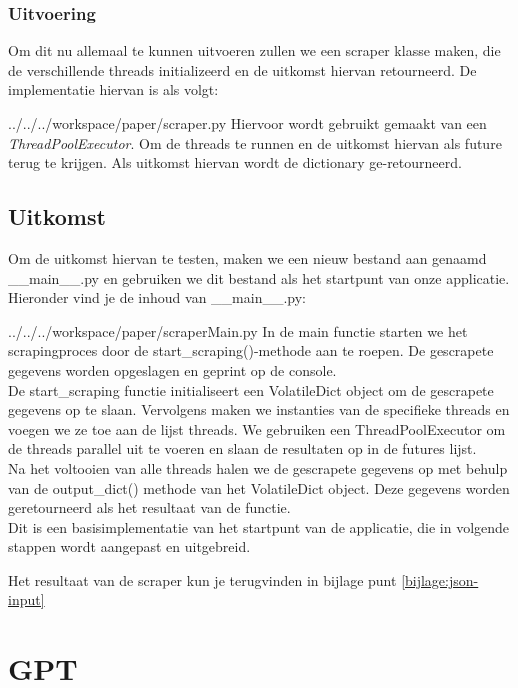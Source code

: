 \subsubsection{Uitvoering}
Om dit nu allemaal te kunnen uitvoeren zullen we een scraper klasse maken, die de verschillende threads initializeerd en de uitkomst hiervan retourneerd. De implementatie hiervan is als volgt: 
\begin{pythoncode}{../../../workspace/paper/scraper.py}
    Hiervoor wordt gebruikt gemaakt van een \emph{ThreadPoolExecutor}. Om de threads te runnen en de uitkomst hiervan als future terug te krijgen. Als uitkomst hiervan wordt de dictionary ge-retourneerd.
\end{pythoncode}

\subsection{Uitkomst}
Om de uitkomst hiervan te testen, maken we een nieuw bestand aan genaamd \_\_main\_\_.py en gebruiken we dit bestand als het startpunt van onze applicatie. Hieronder vind je de inhoud van \_\_main\_\_.py:
\begin{pythoncode}{../../../workspace/paper/scraperMain.py}
In de main functie starten we het scrapingproces door de start\_scraping()-methode aan te roepen. De gescrapete gegevens worden opgeslagen en geprint op de console. \\

De start\_scraping functie initialiseert een VolatileDict object om de gescrapete gegevens op te slaan. Vervolgens maken we instanties van de specifieke threads en voegen we ze toe aan de lijst threads. We gebruiken een ThreadPoolExecutor om de threads parallel uit te voeren en slaan de resultaten op in de futures lijst. \\

Na het voltooien van alle threads halen we de gescrapete gegevens op met behulp van de output\_dict() methode van het VolatileDict object. Deze gegevens worden geretourneerd als het resultaat van de functie. \\

Dit is een basisimplementatie van het startpunt van de applicatie, die in volgende stappen wordt aangepast en uitgebreid.
\end{pythoncode}

Het resultaat van de scraper kun je terugvinden in bijlage punt \ref{bijlage:json-input}


\section{GPT}
